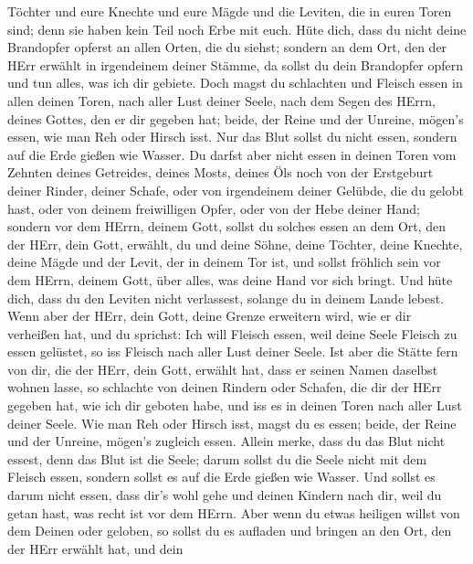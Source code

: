 Töchter und eure Knechte und eure Mägde und die Leviten, die in euren
Toren sind; denn sie haben kein Teil noch Erbe mit euch. 
Hüte dich, dass du nicht deine Brandopfer opferst an allen Orten, die du
siehst;  sondern an dem Ort, den der HErr erwählt in
irgendeinem deiner Stämme, da sollst du dein Brandopfer opfern und tun
alles, was ich dir gebiete.  Doch magst du schlachten und
Fleisch essen in allen deinen Toren, nach aller Lust deiner Seele, nach
dem Segen des HErrn, deines Gottes, den er dir gegeben hat; beide, der
Reine und der Unreine, mögen's essen, wie man Reh oder Hirsch isst.
 Nur das Blut sollst du nicht essen, sondern auf die Erde
gießen wie Wasser.  Du darfst aber nicht essen in deinen
Toren vom Zehnten deines Getreides, deines Mosts, deines Öls noch von
der Erstgeburt deiner Rinder, deiner Schafe, oder von irgendeinem deiner
Gelübde, die du gelobt hast, oder von deinem freiwilligen Opfer, oder
von der Hebe deiner Hand;  sondern vor dem HErrn, deinem
Gott, sollst du solches essen an dem Ort, den der HErr, dein Gott,
erwählt, du und deine Söhne, deine Töchter, deine Knechte, deine Mägde
und der Levit, der in deinem Tor ist, und sollst fröhlich sein vor dem
HErrn, deinem Gott, über alles, was deine Hand vor sich bringt.
 Und hüte dich, dass du den Leviten nicht verlassest,
solange du in deinem Lande lebest.  Wenn aber der HErr,
dein Gott, deine Grenze erweitern wird, wie er dir verheißen hat, und du
sprichst: Ich will Fleisch essen, weil deine Seele Fleisch zu essen
gelüstet, so iss Fleisch nach aller Lust deiner Seele.  Ist
aber die Stätte fern von dir, die der HErr, dein Gott, erwählt hat, dass
er seinen Namen daselbst wohnen lasse, so schlachte von deinen Rindern
oder Schafen, die dir der HErr gegeben hat, wie ich dir geboten habe,
und iss es in deinen Toren nach aller Lust deiner Seele. 
Wie man Reh oder Hirsch isst, magst du es essen; beide, der Reine und
der Unreine, mögen's zugleich essen.  Allein merke, dass du
das Blut nicht essest, denn das Blut ist die Seele; darum sollst du die
Seele nicht mit dem Fleisch essen,  sondern sollst es auf
die Erde gießen wie Wasser.  Und sollst es darum nicht
essen, dass dir's wohl gehe und deinen Kindern nach dir, weil du getan
hast, was recht ist vor dem HErrn.  Aber wenn du etwas
heiligen willst von dem Deinen oder geloben, so sollst du es aufladen
und bringen an den Ort, den der HErr erwählt hat,  und dein
